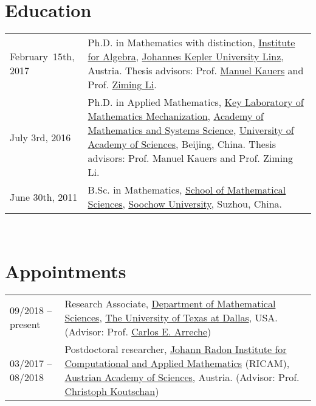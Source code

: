 \documentclass[a4paper,12pt]{article}
\begin{document}

\section*{\Large{Education}}
\begin{tabular}{@{}p{1.5in}p{4in}}
February~15th, 2017   &  Ph.D. in Mathematics with distinction, 
                        \href{http://www.jku.at/algebra/content}{Institute for Algebra}, 
                        \href{http://www.jku.at/content}{Johannes Kepler University Linz}, Austria. 
                        Thesis advisors: Prof. \href{http://www.kauers.de/}{Manuel Kauers} and 
                        Prof. \href{http://mmrc.iss.ac.cn/~zmli/}{Ziming Li}. \\
July 3rd, 2016    & Ph.D. in Applied Mathematics, 
                        \href{http://english.mmrc.amss.cas.cn/}{Key Laboratory of Mathematics Mechanization}, 
                        \href{http://english.amss.cas.cn/}{Academy of Mathematics and Systems Science}, 
                        \href{http://english.ucas.ac.cn/}{University of Academy of Sciences}, Beijing, China. 
                       Thesis advisors: Prof. Manuel Kauers and Prof. Ziming Li.\\
June 30th, 2011    & B.Sc. in Mathematics, \href{http://math.suda.edu.cn/}{School of Mathematical Sciences}, 
                        \href{http://eng.suda.edu.cn/}{Soochow University}, Suzhou, China.  
\end{tabular} \\

\section*{\Large{Appointments}}
\begin{tabular}{@{}p{1.4in}p{4in}}
09/2018 -- present      & Research Associate, \href{https://www.utdallas.edu/math/}{Department of Mathematical Sciences}, 
                        \href{https://www.utdallas.edu/}{The University of Texas at Dallas}, USA. 
                        (Advisor: Prof. \href{https://www.utdallas.edu/~arreche/}{Carlos E. Arreche}) \\    
03/2017 -- 08/2018    & Postdoctoral researcher, 
                        \href{https://www.ricam.oeaw.ac.at/}{Johann Radon Institute for Computational and Applied Mathematics} (RICAM),
                        \href{http://www.oeaw.ac.at/en/austrian-academy-of-sciences/}{Austrian Academy of Sciences}, Austria. 
                        (Advisor: Prof. \href{http://www.koutschan.de/}{Christoph Koutschan})\\
\end{tabular}
\end{document}
